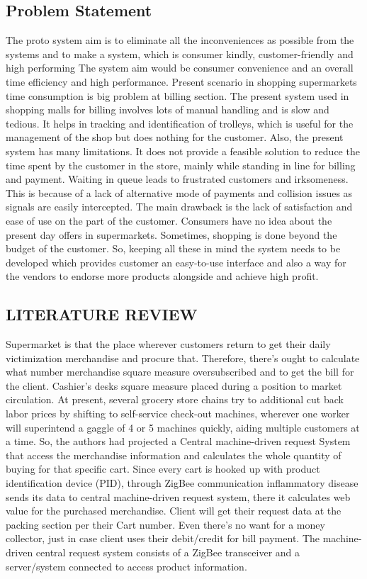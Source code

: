 \documentclass[12pt]{article}
\begin{document}
\subsection{Problem Statement}
\hspace*{1cm}The proto system aim is to eliminate all the inconveniences as possible from the systems and to make a system, which is consumer kindly, customer-friendly and high performing The system aim would be consumer convenience and an overall time efficiency and high performance. Present scenario in shopping supermarkets time consumption is big problem at billing section. The present system used in shopping malls for billing involves lots of manual handling and is slow and tedious. It helps in tracking and identification of trolleys, which is useful for the management of the shop but does nothing for the customer. Also, the present system has many limitations. It does not provide a feasible solution to reduce the time spent by the customer in the store, mainly while standing in line for billing and payment. Waiting in queue leads to frustrated customers and irksomeness. This is because of a lack of alternative mode of payments and collision issues as signals are easily intercepted. The main drawback is the lack of satisfaction and ease of use on the part of the customer. Consumers have no idea about the present day offers in supermarkets. Sometimes, shopping is done beyond the budget of the customer. So, keeping all these in mind the system needs to be developed which provides customer an easy-to-use interface and also a way for the vendors to endorse more products alongside and achieve high profit. 
\newpage
\begin{center}
\section{LITERATURE REVIEW}
\end{center}
\hspace*{1 cm}Supermarket is that the place wherever customers return to get their daily victimization merchandise and procure that. Therefore, there's ought to calculate what number merchandise square measure oversubscribed and to get the bill for the client. Cashier's desks square measure placed during a position to market circulation. At present, several grocery store chains try to additional cut back labor prices by shifting to self-service check-out machines, wherever one worker will superintend a gaggle of 4 or 5 machines quickly, aiding multiple customers at a time. So, the authors had projected a Central machine-driven request System that access the merchandise information and calculates the whole quantity of buying for that specific cart. Since every cart is hooked up with product identification device (PID), through ZigBee communication inflammatory disease sends its data to central machine-driven request system, there it calculates web value for the purchased merchandise. Client will get their request data at the packing section per their Cart number. Even there's no want for a money collector, just in case client uses their debit/credit for bill payment. The machine-driven central request system consists of a ZigBee transceiver and a server/system connected to access product information.\\
\end{document}
